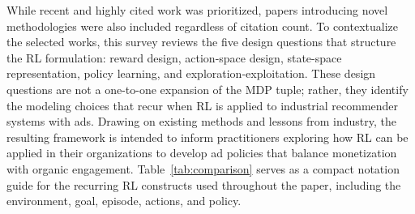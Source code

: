 \documentclass[manuscript,review,screen]{acmart}
\begin{document}
While recent and highly cited work was prioritized, papers introducing novel methodologies were also included regardless of citation count. To contextualize the selected works, this survey reviews the five design questions that structure the RL formulation: reward design, action-space design, state-space representation, policy learning, and exploration-exploitation. These design questions are not a one-to-one expansion of the MDP tuple; rather, they identify the modeling choices that recur when RL is applied to industrial recommender systems with ads. Drawing on existing methods and lessons from industry, the resulting framework is intended to inform practitioners exploring how RL can be applied in their organizations to develop ad policies that balance monetization with organic engagement. Table~\ref{tab:comparison} serves as a compact notation guide for the recurring RL constructs used throughout the paper, including the environment, goal, episode, actions, and policy.
\end{document}
